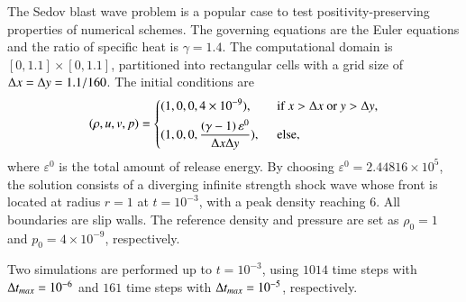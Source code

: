 The Sedov blast wave problem \cite{zhang2012positivity,vilar2016positivity} is a popular case to test positivity-preserving properties of
numerical schemes.
The governing equations are the Euler equations and the ratio of specific heat is $\gamma = 1.4$. The computational domain is $[0,1.1]\times[0,1.1]$, partitioned into rectangular cells with a grid size of $\mathrm\Delta x = \mathrm\Delta y = 1.1/160$. The initial conditions are
\begin{equation}
    (\rho,u,v,p) = \begin{dcases}
        (1,0,0,4\times 10 ^{-9}),\ \                                          & \text{if } x > \inc x \ \mathrm{or} \ y > \inc y, \\
        (1,0,0,\dfrac{\left(\gamma-1\right)\varepsilon^0}{\inc x\inc y}),\ \  & \text{else},                                      \\
    \end{dcases}
\end{equation}
where $\varepsilon^0$ is the total amount of release energy.
By choosing $\varepsilon^0= 2.44816\times 10^5$,
the solution consists of a diverging infinite strength shock wave
whose front is located at radius $r=1$ at $t=10^{-3}$, with a peak density reaching $6$.
All boundaries are slip walls.
The reference density and pressure are set as $\rho_0=1$ and $p_0=4\times10^{-9}$, respectively.

Two simulations are performed up to $t=10^{-3}$,
using $1014$ time steps with $\mathrm\Delta t_{max} = 10^{-6}$
and  $161$ time steps with $\mathrm\Delta t_{max} = 10^{-5}$, respectively.

